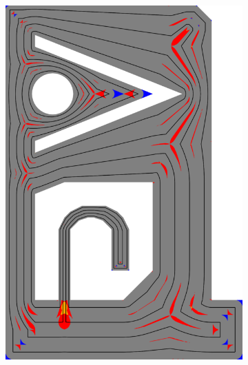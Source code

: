 \begin{figure}
\begin{subfigure}{\figwidth}
\includegraphics[height=\figheight]{sources/validation/gMAT_example/TEST_Constant_accuracy.png}

\end{subfigure}
\end{figure}
